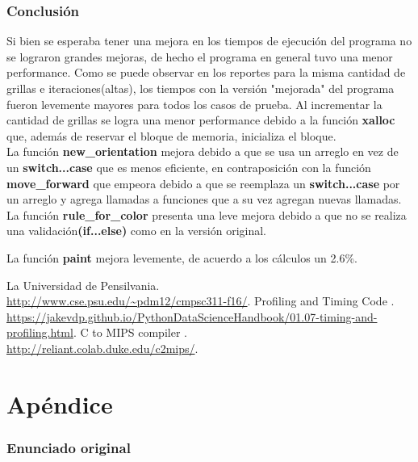 \documentclass[a4paper, 10pt, twoside, notitlepage]{article}
\begin{document}
\section{Conclusión}

Si bien se esperaba tener una mejora en los tiempos de ejecución del programa no se lograron grandes mejoras, de hecho el programa en general tuvo una menor performance. Como se puede observar en los reportes para la misma cantidad de grillas e iteraciones(altas), los tiempos con la versión "mejorada" del programa fueron levemente mayores para todos los casos de prueba. Al incrementar la cantidad de grillas se logra una menor performance debido a la función \textbf{xalloc} que, además de reservar el bloque de memoria, inicializa el bloque. \\

La función \textbf{new\_orientation} mejora debido a que se usa un arreglo en vez de un \textbf{switch...case} que es menos eficiente, en contraposición con la función \textbf{move\_forward} que empeora debido a que se reemplaza un \textbf{switch...case} por un arreglo y agrega llamadas a funciones que a su vez agregan nuevas llamadas. La función \textbf{rule\_for\_color} presenta una leve mejora debido a que no se realiza una validación\textbf{(if...else)} como en la versión original.

La función \textbf{paint} mejora levemente, de acuerdo a los  cálculos un 2.6\%.

\vspace{.5cm}
\begin{thebibliography}{5}
 \bibitem{} La Universidad de Pensilvania.\\ \url{http://www.cse.psu.edu/~pdm12/cmpsc311-f16/}.
 \bibitem{} Profiling and Timing Code
.\\ \url{https://jakevdp.github.io/PythonDataScienceHandbook/01.07-timing-and-profiling.html}.
 \bibitem{} C to MIPS compiler
.\\ \url{http://reliant.colab.duke.edu/c2mips/}.
\end{thebibliography}

\clearpage

\part{Apéndice}
\appendix

\section{Enunciado original}\label{sec:enunciado}

\end{document}
